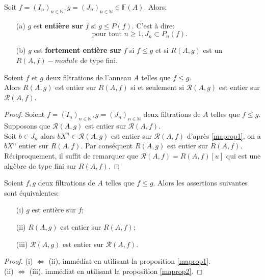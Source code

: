 \begin{madefinition}
	Soit $f=(I_n)_{n \in \mathbb{N}} , g = (J_n)_{n \in \mathbb{N}}\in \mathbb{F}(A)$.  Alors:\\
	\begin{enumerate}
		\item[(a)]$g$ est \textbf{entière sur} $f$ si $g \leqslant P(f)$. C'est à dire:
		\[\text{ pour tout } n \geqslant 1, J_n \subset P_{n}(f). \]
		\item[(b)]$g$ est \textbf{fortement entière sur} $f$ si $f \leqslant g$ et si $R(A,g)$ est un $R(A,f)-module$ de type fini.
	\end{enumerate}
\end{madefinition}
\begin{maproposition}
	\label{maprop2}
	Soient $f$ et $g$ deux filtrations de l'anneau $A$ telles que $f \leqslant g$.\\ Alors $R(A,g)$ est entier sur $R(A,f)$ si et seulement si $\mathcal{R}(A,g)$ est entier sur $\mathcal{R}(A,f)$. 
\end{maproposition}
\begin{proof}
	Soient $f=(I_n)_{n \in \mathbb{N}},g=(J_n)_{n \in \mathbb{N}}$ deux filtrations de $A$ telles que $f \leqslant g$. \\ Supposons que $\mathcal{R}(A,g)$ est entier sur $\mathcal{R}(A,f)$. \\
	Soit $b \in J_n$ alors $bX^n \in \mathcal{R}(A,g)$ est entier sur $\mathcal{R}(A,f)$ d'après \ref{maprop1}, on a $bX^n$ entier sur $R(A,f)$. Par conséquent $R(A,g)$ est entier sur $R(A,f)$.
	Réciproquement, il suffit de remarquer que $\mathcal{R}(A,f)=R(A,f)[u]$ qui est une algèbre de type fini sur $R(A,f)$.
\end{proof}
\begin{maproposition}
	Soient $f,g$ deux filtrations de $A$ telles que $f \leqslant g$. Alors les assertions suivantes sont équivalentes:
	\begin{enumerate}
		\item[(i)] $g$ est entière sur $f$;
		\item[(ii)] $R(A,g)$ est entier sur $R(A,f)$;
		\item[(iii)] $\mathcal{R}(A,g)$ est entier sur $\mathcal{R}(A,f)$.
	\end{enumerate}
\end{maproposition}
\begin{proof}
	(i) $\Longleftrightarrow$ (ii), immédiat en utilisant la proposition \ref{maprop1}. \\
	(ii) $\Longleftrightarrow$ (iii), immédiat en utilisant la proposition \ref{maprop2}.
\end{proof}
